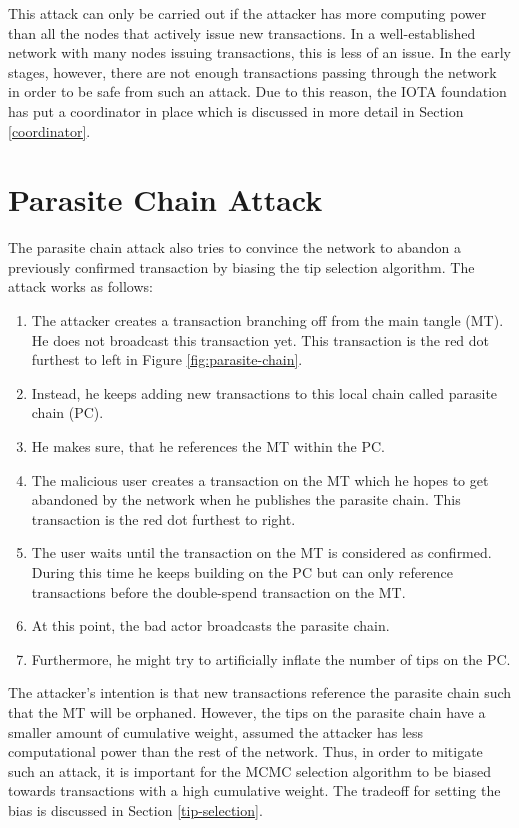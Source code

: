 This attack can only be carried out if the attacker has more computing power than all the nodes that actively issue new transactions. In a well-established network with many nodes issuing transactions, this is less of an issue. In the early stages, however, there are not enough transactions passing through the network in order to be safe from such an attack. Due to this reason, the IOTA foundation has put a coordinator in place which is discussed in more detail in Section \ref{coordinator}.

\section{Parasite Chain Attack}
The parasite chain attack also tries to convince the network to abandon a previously confirmed transaction by biasing the tip selection algorithm. The attack works as follows:
\begin{enumerate}
    \item The attacker creates a transaction branching off from the main tangle (MT). He does not broadcast this transaction yet. This transaction is the red dot furthest to left in Figure \ref{fig:parasite-chain}.
    \item Instead, he keeps adding new transactions to this local chain called parasite chain (PC).
    \item He makes sure, that he references the MT within the PC.
    \item The malicious user creates a transaction on the MT which he hopes to get abandoned by the network when he publishes the parasite chain. This transaction is the red dot furthest to right.
    \item The user waits until the transaction on the MT is considered as confirmed. During this time he keeps building on the PC but can only reference transactions before the double-spend transaction on the MT.
    \item At this point, the bad actor broadcasts the parasite chain.
    \item Furthermore, he might try to artificially inflate the number of tips on the PC.
\end{enumerate}

The attacker's intention is that new transactions reference the parasite chain such that the MT will be orphaned. 
However, the tips on the parasite chain have a smaller amount of cumulative weight, assumed the attacker has less computational power than the rest of the network. 
Thus, in order to mitigate such an attack, it is important for the MCMC selection algorithm to be biased towards transactions with a high cumulative weight. The tradeoff for setting the bias is discussed in Section \ref{tip-selection}.


